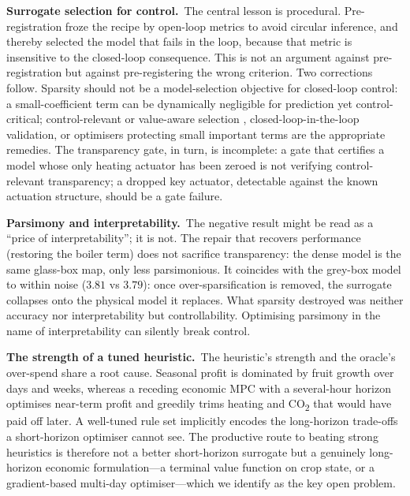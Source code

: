 \documentclass[preprint,3p]{elsarticle}
\begin{document}
\textbf{Surrogate selection for control.}~The central lesson is procedural.
Pre-registration froze the recipe by open-loop metrics to avoid circular inference, and
thereby selected the model that fails in the loop, because that metric is insensitive to
the closed-loop consequence. This is not an argument against pre-registration but against
pre-registering the wrong criterion. Two corrections follow. Sparsity should not be a
model-selection objective for closed-loop control: a small-coefficient term can be
dynamically negligible for prediction yet control-critical; control-relevant or value-aware
selection \citep{farahmand2017value,jacobiandmd2022}, closed-loop-in-the-loop validation, or
optimisers protecting small important terms \citep{balanceguided2026,cortiella2021sparse} are
the appropriate remedies. The transparency gate, in turn, is incomplete: a gate that certifies
a model whose only heating actuator has been zeroed is not verifying control-relevant
transparency; a dropped key actuator, detectable against the known actuation structure, should
be a gate failure.

\textbf{Parsimony and interpretability.}~The negative result might be read as a ``price of
interpretability''; it is not. The repair that recovers performance (restoring the boiler term)
does not sacrifice transparency: the dense model is the same glass-box map, only less
parsimonious. It coincides with the grey-box model to within noise ($3.81$ vs $3.79$): once
over-sparsification is removed, the surrogate collapses onto the physical model it replaces.
What sparsity destroyed was neither accuracy nor interpretability but controllability.
Optimising parsimony in the name of interpretability can silently break control.

\textbf{The strength of a tuned heuristic.}~The heuristic's strength and the oracle's
over-spend share a root cause. Seasonal profit is dominated by fruit growth over days and
weeks, whereas a receding economic MPC with a several-hour horizon optimises near-term profit
and greedily trims heating and CO\textsubscript{2} that would have paid off later. A well-tuned
rule set implicitly encodes the long-horizon trade-offs a short-horizon optimiser cannot see.
The productive route to beating strong heuristics is therefore not a better short-horizon
surrogate but a genuinely long-horizon economic formulation---a terminal value function on crop
state, or a gradient-based multi-day optimiser---which we identify as the key open problem.
\end{document}
